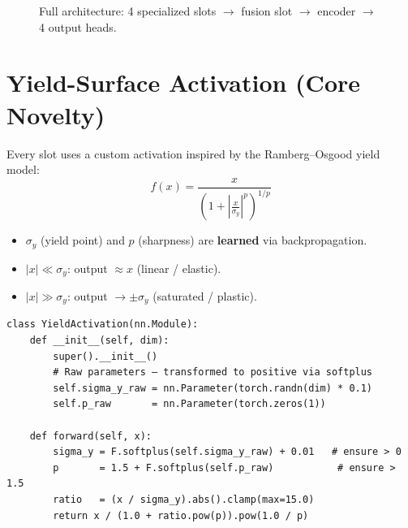 \documentclass[12pt,a4paper]{article}
\begin{document}
\begin{figure}[h]
\caption{Full architecture: 4 specialized slots $\to$ fusion slot $\to$ encoder $\to$ 4 output heads.}
\label{fig:arch}
\end{figure}

\section{Yield-Surface Activation (Core Novelty)}

Every slot uses a custom activation inspired by the Ramberg--Osgood yield model:
\begin{equation}
  f(x) = \frac{x}{\left(1+\left|\frac{x}{\sigma_y}\right|^p\right)^{1/p}}
  \label{eq:yield}
\end{equation}

\begin{itemize}[nosep]
  \item $\sigma_y$ (yield point) and $p$ (sharpness) are \textbf{learned} via backpropagation.
  \item $|x|\ll\sigma_y$: output $\approx x$ (linear / elastic).
  \item $|x|\gg\sigma_y$: output $\to\pm\sigma_y$ (saturated / plastic).
\end{itemize}

\begin{lstlisting}[caption={YieldActivation — the physics-inspired activation.}]
class YieldActivation(nn.Module):
    def __init__(self, dim):
        super().__init__()
        # Raw parameters — transformed to positive via softplus
        self.sigma_y_raw = nn.Parameter(torch.randn(dim) * 0.1)
        self.p_raw       = nn.Parameter(torch.zeros(1))

    def forward(self, x):
        sigma_y = F.softplus(self.sigma_y_raw) + 0.01   # ensure > 0
        p       = 1.5 + F.softplus(self.p_raw)           # ensure > 1.5
        ratio   = (x / sigma_y).abs().clamp(max=15.0)
        return x / (1.0 + ratio.pow(p)).pow(1.0 / p)
\end{lstlisting}
\end{document}
